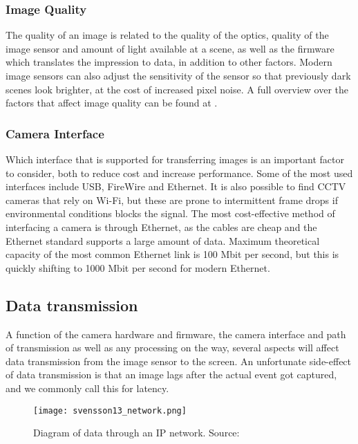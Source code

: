 \subsubsection{Image Quality}
The quality of an image is related to the quality of the optics, quality of the image sensor and amount of light available at a scene, as well as the firmware which translates the impression to data, in addition to other factors.
Modern image sensors can also adjust the sensitivity of the sensor so that previously dark scenes look brighter, at the cost of increased pixel noise.
A full overview over the factors that affect image quality can be found at \citep{imatest15}.

\subsubsection{Camera Interface}
Which interface that is supported for transferring images is an important factor to consider, both to reduce cost and increase performance.
Some of the most used interfaces include USB, FireWire and Ethernet. It is also possible to find CCTV cameras that rely on Wi-Fi, but these are prone to intermittent frame drops if environmental conditions blocks the signal.
The most cost-effective method of interfacing a camera is through Ethernet, as the cables are cheap and the Ethernet standard supports a large amount of data. Maximum theoretical capacity of the most common Ethernet link is 100 Mbit per second, but this is quickly shifting to 1000 Mbit per second for modern Ethernet.

\subsection{Data transmission}
A function of the camera hardware and firmware, the camera interface and path of transmission as well as any processing on the way, several aspects will affect data transmission from the image sensor to the screen. An unfortunate side-effect of data transmission is that an image lags after the actual event got captured, and we commonly call this for latency.

\begin{figure}[ht]
    \centering
    \texttt{[image: svensson13\_network.png]}
    \caption{Diagram of data through an IP network. Source: \citet{svensson13}}
    \label{fig:cfs_simple_new}
\end{figure}
\FloatBarrier


